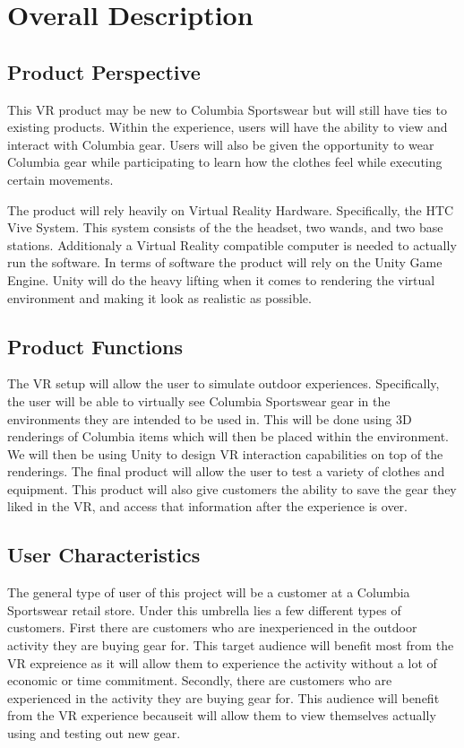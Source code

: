 \documentclass[10pt,journal,compsoc,onecolumn, draftclsnofoot]{IEEEtran}
\begin{document}
\section{Overall Description}
\subsection{Product Perspective}
This VR product may be new to Columbia Sportswear but will still have ties to
existing products. Within the experience, users will have the ability to view
and interact with Columbia gear. Users will also be given the opportunity to
wear Columbia gear while participating to learn how the clothes feel while
executing certain movements.

The product will rely heavily on Virtual Reality Hardware. Specifically, the HTC
Vive System. This system consists of the the headset, two
wands, and two base stations. Additionaly a Virtual Reality compatible computer
is needed to actually run the software. In terms of software the
product will rely on the Unity Game Engine. Unity will do the heavy lifting
when it comes to rendering the virtual environment and making it look as realistic
as possible.

\subsection{Product Functions}
The VR setup will allow the user to simulate outdoor experiences.
Specifically, the user will be able to virtually see Columbia Sportswear
gear in the environments they are intended to be used in.
This will be done using 3D renderings of Columbia items which will then be placed
within the environment. We will then be using Unity to design VR interaction
capabilities on top of the renderings. The final product will allow the user to
test a variety of clothes and equipment. This product will also give customers
the ability to save the gear they liked in the VR, and access that information
after the experience is over.

\subsection{User Characteristics}
The general type of user of this project will be a customer at a Columbia
Sportswear retail store. Under this umbrella lies a few different types of
customers. First there are customers who are inexperienced in the outdoor
activity they are buying gear for. This target audience will benefit most
from the VR expreience as it will allow them to experience the activity without
a lot of economic or time commitment. Secondly, there are customers who are
experienced in the activity they are buying gear for. This audience will benefit
from the VR experience becauseit will allow them to view themselves actually
using and testing out new gear.
\end{document}
